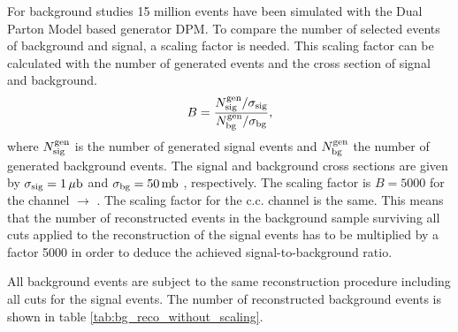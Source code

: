 For background studies 15 million events have been simulated with the Dual Parton Model based generator DPM.
To compare the number of selected events of background and signal, a scaling factor is needed.
This scaling factor can be calculated with the number of generated events and the cross section of signal and background.
\begin{equation}
		B = \frac{N^{\textnormal{gen}}_{\textnormal{sig}}/\sigma_{\textnormal{sig}}}{N^{\textnormal{gen}}_{\textnormal{bg}}/\sigma_{\textnormal{bg}}},
\label{eq:bg_scaling}
\end{equation}
where $N^{\textnormal{gen}}_{\textnormal{sig}}$ is the number of generated signal events and $N^{\textnormal{gen}}_{\textnormal{bg}}$ the number of generated background events.
The signal and background cross sections are given by $\sigma_{\textnormal{sig}} = 1\,\mu\textnormal{b}$ and $\sigma_{\textnormal{bg}} = 50\, \textnormal{mb}$ \cite{PANDAphysics2009}, respectively.
The scaling factor is $B=5000$ for the channel \pbarpSystem $\rightarrow$ \excitedcascade \anticascade.
The scaling factor for the c.c. channel is the same. 
This means that the number of reconstructed events in the background sample surviving all cuts applied to the reconstruction of the signal events 
has to be multiplied by a factor 5000 in order to deduce the achieved signal-to-background ratio. 

%		 

All background events are subject to the same reconstruction procedure including all cuts for the signal events. 
The number of reconstructed background events is shown in table \ref{tab:bg_reco_without_scaling}.


